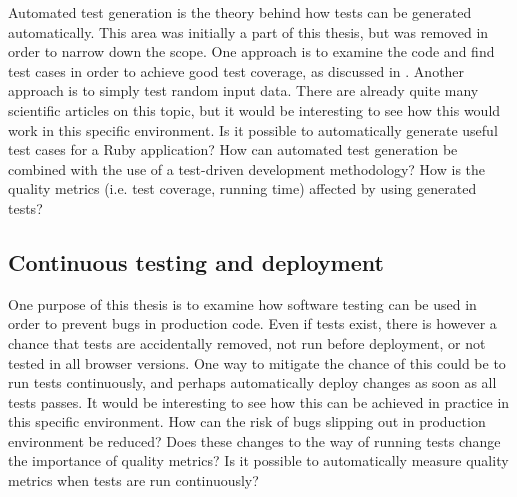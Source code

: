 Automated test generation is the theory behind how tests can be
generated automatically. This area was initially a part of this thesis,
but was removed in order to narrow down the scope. One approach is to
examine the code and find test cases in order to achieve good test
coverage, as discussed in . Another approach
is to simply test random input data. There are already quite many
scientific articles on this topic, but it would be interesting to see
how this would work in this specific environment. Is it possible to
automatically generate useful test cases for a Ruby application? How can
automated test generation be combined with the use of a test-driven
development methodology? How is the quality metrics (i.e. test coverage,
running time) affected by using generated tests?\\


\subsection{Continuous testing and deployment}

One purpose of this thesis is to examine how software testing can be
used in order to prevent bugs in production code. Even if tests exist,
there is however a chance that tests are accidentally removed, not run
before deployment, or not tested in all browser versions. One way to
mitigate the chance of this could be to run tests continuously, and
perhaps automatically deploy changes as soon as all tests passes. It
would be interesting to see how this can be achieved in practice in this
specific environment. How can the risk of bugs slipping out in
production environment be reduced? Does these changes to the way of
running tests change the importance of quality metrics? Is it possible
to automatically measure quality metrics when tests are run
continuously?\\


